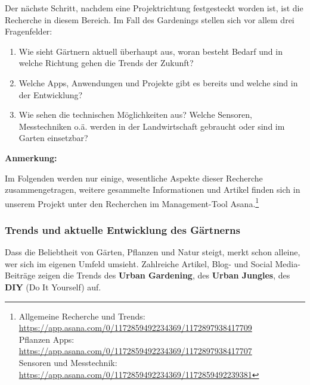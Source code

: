 Der nächste Schritt, nachdem eine Projektrichtung festgesteckt worden
ist, ist die Recherche in diesem Bereich. Im Fall des Gardenings stellen
sich vor allem drei Fragenfelder:

\begin{enumerate}
\def\labelenumi{\arabic{enumi}.}
\tightlist
\item
  Wie sieht Gärtnern aktuell überhaupt aus, woran besteht Bedarf und in
  welche Richtung gehen die Trends der Zukunft?
\item
  Welche Apps, Anwendungen und Projekte gibt es bereits und welche sind
  in der Entwicklung?
\item
  Wie sehen die technischen Möglichkeiten aus? Welche Sensoren,
  Messtechniken o.ä. werden in der Landwirtschaft gebraucht oder sind im
  Garten einsetzbar?
\end{enumerate}

\textbf{Anmerkung:}

Im Folgenden werden nur einige, wesentliche Aspekte dieser Recherche
zusammengetragen, weitere gesammelte Informationen und Artikel finden
sich in unserem Projekt unter den Recherchen im Management-Tool
Asana.\footnote{Allgemeine Recherche und Trends:
  \url{https://app.asana.com/0/1172859492234369/1172897938417709}\\
  Pflanzen Apps:
  \url{https://app.asana.com/0/1172859492234369/1172897938417707}\\
  Sensoren und Messtechnik:
  \url{https://app.asana.com/0/1172859492234369/1172859492239381}}

\hypertarget{trends-und-aktuelle-entwicklung-des-guxe4rtnerns}{%
\subsubsection{Trends und aktuelle Entwicklung des
Gärtnerns}\label{trends-und-aktuelle-entwicklung-des-guxe4rtnerns}}

Dass die Beliebtheit von Gärten, Pflanzen und Natur steigt, merkt schon
alleine, wer sich im eigenen Umfeld umsieht. Zahlreiche Artikel, Blog-
und Social Media-Beiträge zeigen die Trends des \textbf{Urban
Gardening}, des \textbf{Urban Jungles}, des \textbf{DIY} (Do It
Yourself) auf.

